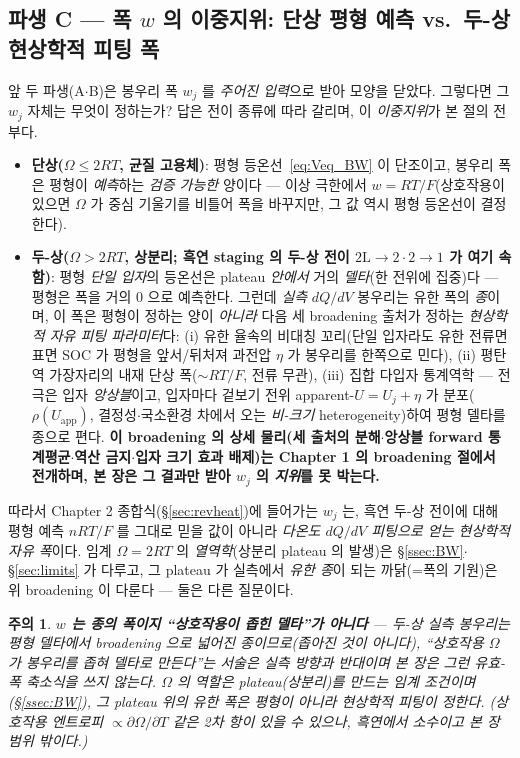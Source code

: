 \documentclass[11pt,a4paper]{article}
\newtheorem*{warnbox}{주의}
\newcommand{\app}{\mathrm{app}}
\begin{document}
\subsection{파생 C — 폭 $w$ 의 이중지위: 단상 평형 예측 vs.\ 두-상 현상학적 피팅 폭}\label{ssec:weff}
앞 두 파생(A$\cdot$B)은 봉우리 폭 $w_j$ 를 \emph{주어진 입력}으로 받아 모양을 닫았다. 그렇다면 그 $w_j$ 자체는
무엇이 정하는가? 답은 전이 종류에 따라 갈리며, 이 \emph{이중지위}가 본 절의 전부다.
\begin{itemize}[leftmargin=1.4em,itemsep=2pt]
\item \textbf{단상($\Omega\le2RT$, 균질 고용체)}: 평형 등온선~\eqref{eq:Veq_BW} 이 단조이고, 봉우리 폭은 평형이
\emph{예측}하는 \emph{검증 가능한} 양이다 — 이상 극한에서 $w=RT/F$(상호작용이 있으면 $\Omega$ 가 중심 기울기를 비틀어 폭을
바꾸지만, 그 값 역시 평형 등온선이 결정한다).
\item \textbf{두-상($\Omega>2RT$, 상분리; 흑연 staging 의 두-상 전이 $2\mathrm L\!\to\!2\cdot2\!\to\!1$ 가 여기 속함)}: 평형 \emph{단일 입자}의 등온선은
plateau \emph{안에서} 거의 \emph{델타}(한 전위에 집중)다 — 평형은 폭을 거의 0 으로 예측한다. 그런데 \emph{실측}
$dQ/dV$ 봉우리는 유한 폭의 \emph{종}이며, 이 폭은 평형이 정하는 양이 \emph{아니라} 다음 세 broadening 출처가
정하는 \emph{현상학적 자유 피팅 파라미터}다: (i) 유한 율속의 비대칭 꼬리(단일 입자라도 유한 전류면 표면 SOC
가 평형을 앞서/뒤처져 과전압 $\eta$ 가 봉우리를 한쪽으로 민다), (ii) 평탄역 가장자리의 내재 단상 폭($\sim RT/F$,
전류 무관), (iii) 집합 다입자 통계역학 — 전극은 입자 \emph{앙상블}이고, 입자마다 겉보기 전위 apparent-$U=U_j+\eta$ 가
분포($\rho(U_\app)$, 결정성$\cdot$국소환경 차에서 오는 \emph{비-크기} heterogeneity)하여 평형 델타를 종으로
편다. \textbf{이 broadening 의 상세 물리(세 출처의 분해$\cdot$앙상블 forward 통계평균$\cdot$역산 금지$\cdot$입자
크기 효과 배제)는 Chapter 1 의 broadening 절에서 전개하며, 본 장은 그 결과만 받아 $w_j$ 의 \emph{지위}를 못
박는다.}
\end{itemize}
따라서 Chapter 2 종합식(\S\ref{sec:revheat})에 들어가는 $w_j$ 는, 흑연 두-상 전이에 대해 평형 예측
$nRT/F$ 를 그대로 믿을 값이 아니라 \emph{다온도 $dQ/dV$ 피팅으로 얻는 현상학적 자유 폭}이다. 임계
$\Omega=2RT$ 의 \emph{열역학}(상분리 plateau 의 발생)은 \S\ref{ssec:BW}$\cdot$\S\ref{sec:limits} 가 다루고, 그
plateau 가 실측에서 \emph{유한 종}이 되는 까닭(=폭의 기원)은 위 broadening 이 다룬다 — 둘은 다른 질문이다.
\begin{warnbox}
\textbf{$w$ 는 종의 폭이지 ``상호작용이 좁힌 델타''가 아니다} — 두-상 실측 봉우리는 평형 델타에서 broadening 으로
\emph{넓어진} 종이므로(좁아진 것이 아니다), ``상호작용 $\Omega$ 가 봉우리를 좁혀 델타로 만든다''는 서술은
\emph{실측 방향과 반대}이며 본 장은 그런 유효-폭 축소식을 쓰지 않는다. $\Omega$ 의 역할은 plateau(상분리)를
\emph{만드는} 임계 조건이며(\S\ref{ssec:BW}), 그 plateau 위의 \emph{유한 폭}은 평형이 아니라 현상학적 피팅이
정한다. (상호작용 엔트로피 $\propto\partial\Omega/\partial T$ 같은 2차 항이 있을 수 있으나, 흑연에서 소수이고
본 장 범위 밖이다.)
\end{warnbox}
\end{document}
